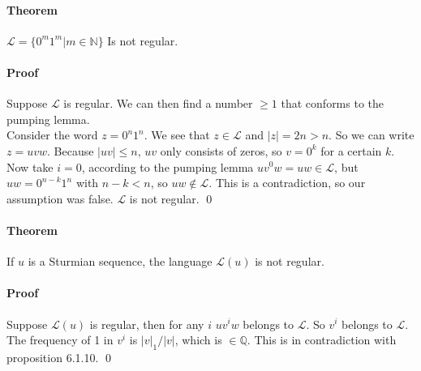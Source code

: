 \documentclass{article}
\begin{document}
\paragraph{Theorem}
$\mathcal{L} = \{0^m1^m | m \in \mathbb{N}\}$ Is not regular.

\paragraph{Proof}
Suppose $\mathcal{L}$ is regular. We can then find a number $\ge 1$ that
conforms to the pumping lemma.\\
Consider the word $z = 0^n1^n$. We see that $z \in \mathcal{L}$ and
$|z| = 2n > n$. So we can write $z = uvw$. Because $|uv| \le n$, $uv$ only
consists of zeros, so $v = 0^k$ for a certain $k$. Now take $i = 0$, according
to the pumping lemma $uv^0w = uw \in \mathcal{L}$, but $uw = 0^{n - k}1^n$
with $n - k < n$, so $uw \notin \mathcal{L}$. This is a contradiction, so our
assumption was false. $\mathcal{L}$ is not regular. \qed

\paragraph{Theorem}
If $u$ is a Sturmian sequence, the language $\mathcal{L}(u)$ is not regular.

\paragraph{Proof}
Suppose $\mathcal{L}(u)$ is regular, then for any $i$ $uv^iw$ belongs to
$\mathcal{L}$. So $v^i$ belongs to $\mathcal{L}$. The frequency of 1 in $v^i$
is $|v|_1 / |v|$, which is $\in \mathbb{Q}$. This is in contradiction with
proposition 6.1.10. \qed
\end{document}
